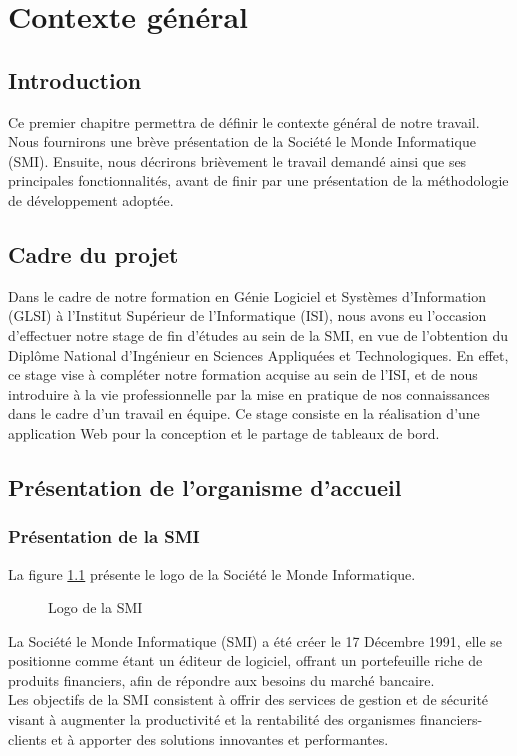 \chapter{Contexte général}
\section*{Introduction}
Ce premier chapitre permettra de définir le contexte général de notre travail. Nous fournirons une brève présentation de la Société le Monde Informatique (SMI). Ensuite, nous décrirons brièvement le travail demandé ainsi que ses principales fonctionnalités, avant de finir par une présentation de la méthodologie de développement adoptée.


\section{Cadre du projet}
Dans le cadre de notre formation en Génie Logiciel et Systèmes d’Information (GLSI) à l'Institut Supérieur de l'Informatique (ISI), nous avons eu l'occasion d'effectuer notre stage de fin d'études au sein de la SMI, en vue de l'obtention du Diplôme National d’Ingénieur en Sciences Appliquées et Technologiques. En effet, ce stage vise à compléter notre formation acquise au sein de l'ISI, et de nous introduire à la vie professionnelle par la mise en pratique de nos connaissances dans le cadre d’un travail en équipe. Ce stage consiste en la réalisation d’une application Web pour la conception et le partage de tableaux de bord.
\section[Organisme d'accueil]{Présentation de l'organisme d'accueil}
\subsection{Présentation de la SMI}
La figure \ref{fig:logo_tt} présente le logo de la Société le Monde Informatique.\\
\begin{figure}[htpb]
\centering
{}
\caption{Logo de la SMI}
\label{fig:logo_tt}
\end{figure}
\newline
La Société le Monde Informatique (SMI) a été créer le 17 Décembre 1991, elle se positionne comme étant un éditeur de logiciel, offrant un portefeuille riche de produits financiers, afin de répondre aux besoins du marché bancaire.\\
Les objectifs de la SMI consistent à offrir des services de gestion et de sécurité visant à augmenter la productivité et la rentabilité des organismes financiers-clients et à apporter des solutions innovantes et performantes.



